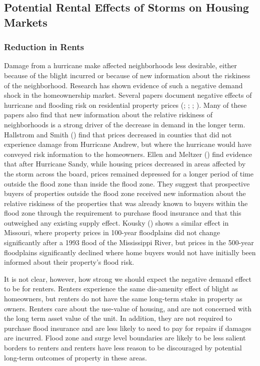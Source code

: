 \documentclass[12pt]{article}
\begin{document}
{{\subsection{Potential Rental Effects of Storms on Housing Markets}{\label{sec:markets}

\subsubsection*{Reduction in Rents}
Damage from a hurricane make affected neighborhoods less desirable, either because of the blight incurred or because of new information about the riskiness of the neighborhood.  Research has shown evidence of such a negative demand shock in the homeownership market.  Several papers document negative effects of hurricane and flooding risk on residential property prices (\citep{bin_effects_2004}; \cite{ortega_rising_2018}; \cite{gillespie_information_2020}; \cite{hennighausen_flood_2020}).   Many of these papers also find that new information about the relative riskiness of neighborhoods is a strong driver of the decrease in demand in the longer term. Hallstrom and Smith (\citeyear{hallstrom_market_2005}) find that prices decreased in counties that did not experience damage from Hurricane Andrew, but where the hurricane would have conveyed risk information to the homeowners. Ellen and Meltzer (\citeyear{ellen_heterogeneity_2022}) find evidence that after Hurricane Sandy, while housing prices decreased in areas affected by the storm across the board, prices remained depressed for a longer period of time outside the flood zone than inside the flood zone.  They suggest that prospective buyers of properties outside the flood zone received new information about the relative riskiness of the properties that was already known to buyers within the flood zone through the requirement to purchase flood insurance and that this outweighed any existing supply effect. Kousky (\citeyear{kousky_learning_2010}) shows a similar effect in Missouri, where property prices in 100-year floodplains did not change significantly after a 1993 flood of the Mississippi River, but prices in the 500-year floodplains significantly declined where home buyers would not have initially been informed about their property's flood risk.

It is not clear, however, how strong we should expect the negative demand effect to be for renters.  Renters experience the same dis-amenity effect of blight as homeowners, but renters do not have the same long-term stake in property as owners. Renters care  about the use-value of housing, and are not concerned with the long term asset value of the unit.  In addition, they are not required to purchase flood insurance and are less likely to need to pay for repairs if damages are incurred.  Flood zone and surge level boundaries are likely to be less salient borders to renters and renters have less reason to be discouraged by potential long-term outcomes of property in these areas. 

}}}
\end{document}

